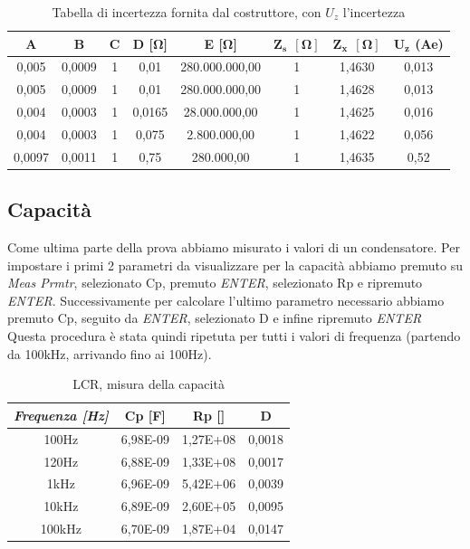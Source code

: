 \begin{table}[!ht]
\centering
\begin{tabular}{|c|c|c|c|c|c|c|c|}
\hline
\textbf{A}      & \textbf{B}      & \textbf{C} & \textbf{D [$\bm{\Omega}$]} & \textbf{E [$\bm{\Omega}$]}  & $\bm{Z_s \ \ [\Omega]}$ & $\bm{Z_x \ \ [\Omega]}$ & $\bm{U_z}$ \textbf{(Ae)} \\ \hline
0,005  & 0,0009 & 1 & 0,01      & 280.000.000,00  & 1          & 1,4630     & 0,013  \\ \hline
0,005  & 0,0009 & 1 & 0,01      & 280.000.000,00  & 1          & 1,4628     & 0,013  \\ \hline
0,004  & 0,0003 & 1 & 0,0165    & 28.000.000,00  & 1          & 1,4625     & 0,016  \\ \hline
0,004  & 0,0003 & 1 & 0,075     & 2.800.000,00  & 1          & 1,4622     & 0,056  \\ \hline
0,0097 & 0,0011 & 1 & 0,75      & 280.000,00  & 1          & 1,4635     & 0,52  \\ \hline
\end{tabular}
\caption{Tabella di incertezza fornita dal costruttore, con $U_z$ l'incertezza}
\label{tab:lcr_z_sheet}
\end{table}
\FloatBarrier

\clearpage


\subsection{Capacità}
\label{sub:c}
Come ultima parte della prova abbiamo misurato i valori di un condensatore.
Per impostare i primi 2 parametri da visualizzare per la capacità abbiamo premuto su \emph{Meas Prmtr}, selezionato Cp, premuto \emph{ENTER}, selezionato Rp e ripremuto \emph{ENTER}. Successivamente per calcolare l'ultimo parametro necessario abbiamo premuto Cp, seguito da \emph{ENTER}, selezionato D e infine ripremuto \emph{ENTER}
Questa procedura è stata quindi ripetuta per tutti i valori di frequenza (partendo da 100kHz, arrivando fino ai 100Hz).


\begin{table}[ht]
\centering
\begin{tabular}{|c|c|c|c|}
\hline 
\textit{\textbf{Frequenza [Hz]}} & \textbf{Cp [F]} & \textbf{Rp [\bm{$\Omega$}]} & \textbf{D}  \\ \hline
100Hz                       & 6,98E-09    & 1,27E+08     & 0,0018     \\ \hline
120Hz                       & 6,88E-09    & 1,33E+08     & 0,0017      \\ \hline
1kHz                        & 6,96E-09    & 5,42E+06     & 0,0039      \\ \hline
10kHz                       & 6,89E-09    & 2,60E+05     & 0,0095      \\ \hline
100kHz                      & 6,70E-09    & 1,87E+04     & 0,0147      \\ \hline
\end{tabular}%
\caption{LCR, misura della capacità}
\label{tab:lcr_c}
\end{table}
\FloatBarrier

